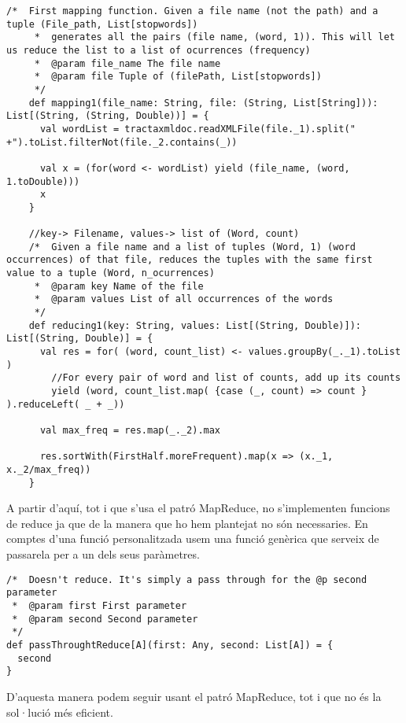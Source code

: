 \documentclass{report}
\begin{document}
\begin{lstlisting}[style=scalaHighlight]
    /*  First mapping function. Given a file name (not the path) and a tuple (File_path, List[stopwords])
     *  generates all the pairs (file name, (word, 1)). This will let us reduce the list to a list of ocurrences (frequency)
     *  @param file_name The file name
     *  @param file Tuple of (filePath, List[stopwords])
     */
    def mapping1(file_name: String, file: (String, List[String])): List[(String, (String, Double))] = {
      val wordList = tractaxmldoc.readXMLFile(file._1).split(" +").toList.filterNot(file._2.contains(_))

      val x = (for(word <- wordList) yield (file_name, (word, 1.toDouble)))
      x
    }

    //key-> Filename, values-> list of (Word, count)
    /*  Given a file name and a list of tuples (Word, 1) (word occurrences) of that file, reduces the tuples with the same first value to a tuple (Word, n_ocurrences)
     *  @param key Name of the file
     *  @param values List of all occurrences of the words
     */
    def reducing1(key: String, values: List[(String, Double)]): List[(String, Double)] = {
      val res = for( (word, count_list) <- values.groupBy(_._1).toList )
        //For every pair of word and list of counts, add up its counts
        yield (word, count_list.map( {case (_, count) => count } ).reduceLeft( _ + _))

      val max_freq = res.map(_._2).max

      res.sortWith(FirstHalf.moreFrequent).map(x => (x._1, x._2/max_freq))
    }

\end{lstlisting}

A partir d'aquí, tot i que s'usa el patró MapReduce, no s'implementen funcions de reduce ja que de la manera que ho hem plantejat no són necessaries. En comptes d'una funció personalitzada usem una funció genèrica que serveix de passarela per a un dels seus paràmetres.

\begin{lstlisting}[style=scalaHighlight]
/*	Doesn't reduce. It's simply a pass through for the @p second parameter
 * 	@param first First parameter
 * 	@param second Second parameter
 */
def passThroughtReduce[A](first: Any, second: List[A]) = {
  second
}
\end{lstlisting}

D'aquesta manera podem seguir usant el patró MapReduce, tot i que no és la sol·lució més eficient. \\
\end{document}
